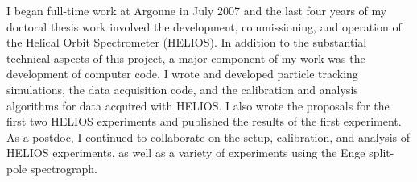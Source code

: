 I began full-time work at Argonne in July 2007 and the last four years of my doctoral thesis work involved the
 development, commissioning, and operation of the Helical Orbit Spectrometer (HELIOS).
In addition to the substantial technical aspects of this project,
 a major component of my work was the development of computer code. %
I wrote and developed particle tracking simulations, %
 the data acquisition code, and %
 the calibration and analysis algorithms for data acquired with HELIOS. 
 I also wrote the proposals for the first two HELIOS experiments and published the results of the first experiment.
As a postdoc, 
 I continued to collaborate on %
the setup, calibration, and analysis of HELIOS experiments, as well as %
 a variety of experiments using the Enge split-pole spectrograph.%

